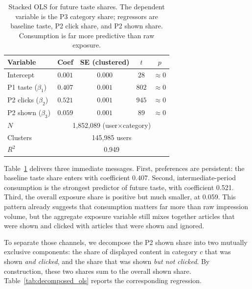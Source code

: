 \documentclass[11pt]{article}
\begin{document}
\begin{table}[ht]
\centering
\caption{Stacked OLS for future taste shares. The dependent variable is the P3 category share; regressors are baseline taste, P2 click share, and P2 shown share. Consumption is far more predictive than raw exposure.}
\label{tab:stacked_ols}
\begin{tabular}{lcccc}
\toprule
Variable & Coef & SE (clustered) & $t$ & $p$ \\
\midrule
Intercept & $0.001$ & $0.000$ & $28$ & $\approx 0$ \\
P1 taste ($\beta_1$) & $0.407$ & $0.001$ & $802$ & $\approx 0$ \\
P2 clicks ($\beta_2$) & $0.521$ & $0.001$ & $945$ & $\approx 0$ \\
P2 shown ($\beta_3$) & $0.059$ & $0.001$ & $89$ & $\approx 0$ \\
\midrule
$N$ & \multicolumn{4}{c}{1,852,089 (user$\times$category)} \\
Clusters & \multicolumn{4}{c}{145,985 users} \\
$R^2$ & \multicolumn{4}{c}{0.949} \\
\bottomrule
\end{tabular}
\end{table}
\FloatBarrier

Table~\ref{tab:stacked_ols} delivers three immediate messages. First, preferences are persistent: the baseline taste share enters with coefficient 0.407. Second, intermediate-period consumption is the strongest predictor of future taste, with coefficient 0.521. Third, the overall exposure share is positive but much smaller, at 0.059. This pattern already suggests that consumption matters far more than raw impression volume, but the aggregate exposure variable still mixes together articles that were shown and clicked with articles that were shown and ignored.

To separate those channels, we decompose the P2 shown share into two mutually exclusive components: the share of displayed content in category $c$ that was shown \emph{and clicked}, and the share that was shown \emph{but not clicked}. By construction, these two shares sum to the overall shown share. Table~\ref{tab:decomposed_ols} reports the corresponding regression.
\end{document}
